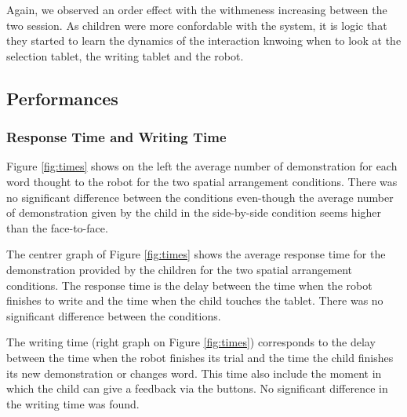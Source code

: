 \documentclass[letterpaper, 10 pt, conference]{ieeeconf}  %
\begin{document}
Again, we observed an order effect with the withmeness increasing between the two session. 
As children were more confordable with the system, it is logic that they started to learn the dynamics of the interaction knwoing when to look at the selection tablet, the writing tablet and the robot. 

\subsection{Performances}
\subsubsection{Response Time and Writing Time}
Figure \ref{fig:times} shows on the left the average number of demonstration for each word thought to the robot for the two spatial arrangement conditions. 
There was no significant difference between the conditions even-though the average number of demonstration given by the child in the side-by-side condition seems higher than the face-to-face.

The centrer graph of Figure \ref{fig:times} shows the average response time for the demonstration provided by the children for the two spatial arrangement conditions.
The response time is the delay between the time when the robot finishes to write and the time when the child touches the tablet.
There was no significant difference between the conditions.
 
The writing time (right graph on Figure \ref{fig:times}) corresponds to the delay between the time when the robot finishes its trial and the time the child finishes its new demonstration or changes word. This time also include the moment in which the child can give a feedback via the buttons.
No significant difference in the writing time was found. 
\end{document}
